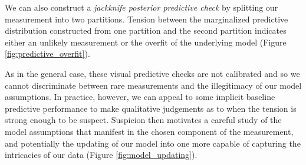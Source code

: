 \begin{figure*}
\centering
{}
\caption{(a) When the measurement, $d$, is consistent with the 
posterior predictive distribution we have no reason to doubt our 
model assumptions, but (b) tension between the measurement and
the posterior predictive distribution indicates that there may be a
problem.  Either the measurement was exceedingly rare or our
model assumptions are insufficient.
}
\label{fig:predictive_misfit}
\end{figure*}

We can also construct a \emph{jackknife posterior predictive
check} by splitting our measurement into two partitions.  Tension
between the marginalized predictive distribution constructed from
one partition and the second partition indicates either an unlikely
measurement or the overfit of the underlying model (Figure
 \ref{fig:predictive_overfit}).

\begin{figure*}
\centering
{}
\caption{To test for potential overfit we need multiple measurements,
and given only a single measurement this can emulated by splitting
the measurement into two partitions, $d_{1}$ and $d_{2}$.  (a) When 
both measurements are consistent with the posterior predictive 
distribution we have no reason to doubt our model assumptions, but 
(b) tension between the held-out measurement, $d_{2}$ and the 
posterior predictive distribution indicates that the model might be
overfitting to $d_{1}$.  Either the partition generated an exceedingly 
rare measurement or our model assumptions are insufficient.
}
\label{fig:predictive_overfit}
\end{figure*}

As in the general case, these visual predictive checks are not
calibrated and so we cannot discriminate between rare measurements 
and the illegitimacy of our model assumptions.  In practice, however, we 
can appeal to some implicit baseline predictive performance to make 
qualitative judgements as to when the tension is strong enough to be 
suspect.  Suspicion then motivates a careful study of the model 
assumptions that manifest in the chosen component of the 
measurement, and potentially the updating of our model into one more
capable of capturing the intricacies of our data 
(Figure \ref{fig:model_updating}).

